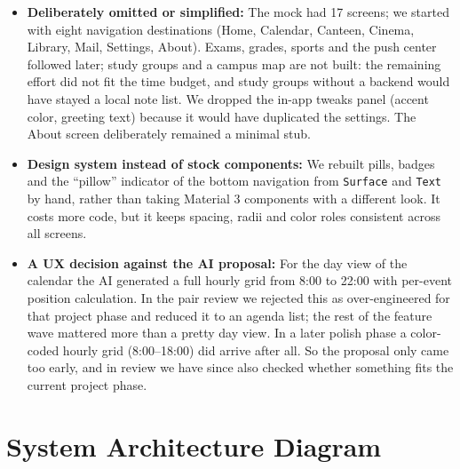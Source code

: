 \documentclass{msereport}
\begin{document}
\begin{itemize}
  \item \textbf{Deliberately omitted or simplified:} The mock had 17
        screens; we started with eight navigation destinations (Home, Calendar,
        Canteen, Cinema, Library, Mail, Settings, About). Exams, grades, sports
        and the push center followed later; study groups and a campus map are
        not built: the remaining effort did not fit the time budget, and study
        groups without a backend would have stayed a local note list. We dropped
        the in-app tweaks panel (accent color, greeting text) because it would
        have duplicated the settings. The About screen deliberately remained a
        minimal stub.
  \item \textbf{Design system instead of stock components:} We rebuilt pills,
        badges and the ``pillow'' indicator of the bottom navigation from
        \texttt{Surface} and \texttt{Text} by hand, rather than taking
        Material 3 components with a different look. It costs more code, but it
        keeps spacing, radii and color roles consistent across all screens.
  \item \textbf{A UX decision against the AI proposal:} For the day view of the
        calendar the AI generated a full hourly grid from 8:00 to 22:00 with
        per-event position calculation. In the pair review we rejected this as
        over-engineered for that project phase and reduced it to an agenda list;
        the rest of the feature wave mattered more than a pretty day view. In a
        later polish phase a color-coded hourly grid (8:00--18:00) did arrive
        after all. So the proposal only came too early, and in review we have
        since also checked whether something fits the current project phase.
\end{itemize}

\msegap

\section{System Architecture Diagram}
\end{document}
